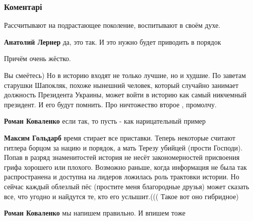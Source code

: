  
 
 
 
 
\subsubsection{Коментарі}
\label{sec:21_10_2021.fb.goldarb_maksim.1.vlast_ubogaja.cmt}

\begin{itemize} %
Рассчитывают на подрастающее поколение, воспитывают в своём духе.

\begin{itemize} %
\textbf{Анатолий Лернер} да, это так. И это нужно будет приводить в порядок

Причём очень жёстко.
\end{itemize} %


Вы смеётесь) Но в историю входят не только лучшие, но и худшие.
По заветам старушки Шапокляк, похоже нынешний человек, который случайно занимает должность Президента Украины, может войти в историю как самый никчемный президент. И его будут помнить.
Про ничтожество второе , промолчу.

\begin{itemize} %
\textbf{Роман Коваленко} если так, то пусть - как нарицательный пример

\textbf{Максим Гольдарб} время стирает все приставки. Теперь некоторые считают гитлера борцом за нацию и порядок, а мать Терезу убийцей (прости Господи).
Попав в разряд знаменитостей история не несёт закономерностей присвоения грифа хорошего или плохого.
Возможно раньше, когда информация не была так распространена и доступна на лидеров ложилась роль трактовки истории. Но сейчас каждый облезлый пёс (простите меня благородные друзья) может сказать все, что угодно и найдутся те, кто его услышит.(((
Такое вот оно гибридное)

\textbf{Роман Коваленко} мы напишем правильно. И впишем тоже
\end{itemize} %



\end{itemize}
